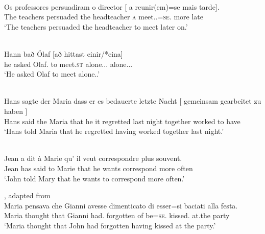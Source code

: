 \documentclass[output=paper]{langsci/langscibook}
\begin{document}
\ea\label{ex:key:24.3}  \parencite[34]{Sheehan2018b}\\
	\gll Os professores   persuadiram   o director  [ a    reunir(em)=se     mais tarde].\\
    The teachers   persuaded   the headteacher {} \textsc{a} meet.\Inf{}.\Tpl=\textsc{se}.\Third{}   more late\\
	\glt ‘The teachers persuaded the headteacher to meet later on.’
\z

\ea\label{ex:key:24.4}  \parencite[149]{Sheehan2018b}\\
	\gll Hann bað    Ólaf     [að   hittast     einir/*eina]\\
he      asked Olaf.\Acc{}    to  meet.\textsc{st}   alone.\Nom.\M.\Pl{} alone.\Acc.\M.\Pl{}\\
	\glt ‘He asked Olaf to meet alone.\Pl{}.’
\z

\ea\label{ex:key:24.5}  \parencite[45]{Landau2000}\\
	\gll Hans sagte der Maria dass er  es   bedauerte   letzte Nacht [ gemeinsam   gearbeitet   zu haben ]\\
    Hans said   the Maria that    he it   regretted   last night {} together     worked   to have\\
	\glt ‘Hans told Maria that he regretted having worked together last night.’
\z

\ea\label{ex:key:24.6}  \parencite[85]{Landau2000}\\
	\gll Jean a    dit      à Marie  qu’   il  veut    correspondre plus  souvent.\\
		Jean has said   to Marie that he wants correspond    more often\\
	\glt ‘John told Mary that he wants to correspond more often.’
\z

\ea\label{ex:key:24.7} , adapted from \parencite[46]{Landau2000}\\
	\gll Maria pensava che Gianni avesse dimenticato di esser=si baciati alla festa.\\
		Maria thought that Gianni had.\Sbjv{} forgotten of be=\textsc{se}.\Third{} kissed.\Pl{} at.the party\\
	\glt ‘Maria thought that John had forgotten having kissed at the party.’
\z
\end{document}
